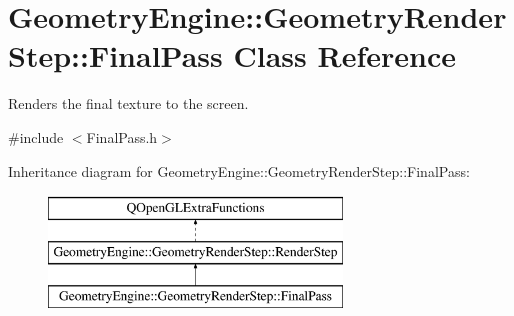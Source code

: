 \hypertarget{class_geometry_engine_1_1_geometry_render_step_1_1_final_pass}{}\section{Geometry\+Engine\+::Geometry\+Render\+Step\+::Final\+Pass Class Reference}
\label{class_geometry_engine_1_1_geometry_render_step_1_1_final_pass}


Renders the final texture to the screen.  




{\ttfamily \#include $<$Final\+Pass.\+h$>$}

Inheritance diagram for Geometry\+Engine\+::Geometry\+Render\+Step\+::Final\+Pass\+:\begin{figure}[H]
\begin{center}
\leavevmode
\includegraphics[height=3.000000cm]{class_geometry_engine_1_1_geometry_render_step_1_1_final_pass}
\end{center}
\end{figure}
